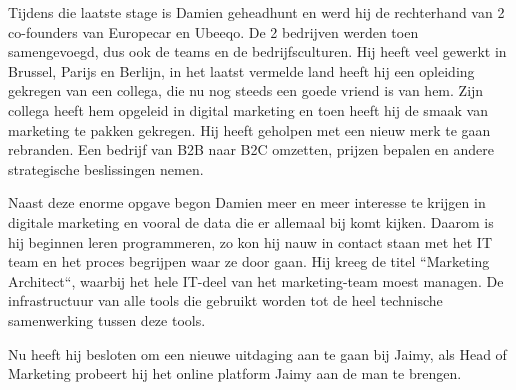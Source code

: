 Tijdens die laatste stage is Damien geheadhunt en werd hij de rechterhand van 2 co-founders van Europecar en Ubeeqo. De 2 bedrijven werden toen samengevoegd, dus ook de teams en de bedrijfsculturen. Hij heeft veel gewerkt in Brussel, Parijs en Berlijn, in het laatst vermelde land heeft hij een opleiding gekregen van een collega, die nu nog steeds een goede vriend is van hem. Zijn collega heeft hem opgeleid in digital marketing en toen heeft hij de smaak van marketing te pakken gekregen. Hij heeft geholpen met een nieuw merk te gaan rebranden. Een bedrijf van B2B naar B2C omzetten, prijzen bepalen en andere strategische beslissingen nemen.

Naast deze enorme opgave begon Damien meer en meer interesse te krijgen in digitale marketing en vooral de data die er allemaal bij komt kijken. Daarom is hij beginnen leren programmeren, zo kon hij nauw in contact staan met het IT team en het proces begrijpen waar ze door gaan. Hij kreeg de titel ``Marketing Architect``, waarbij het hele IT-deel van het marketing-team moest managen. De infrastructuur van alle tools die gebruikt worden tot de heel technische samenwerking tussen deze tools.

Nu heeft hij besloten om een nieuwe uitdaging aan te gaan bij Jaimy, als Head of Marketing probeert hij het online platform Jaimy aan de man te brengen.

